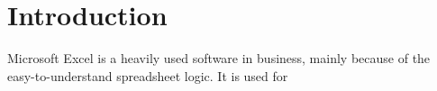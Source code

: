 \chapter{Introduction}
Microsoft Excel is a heavily used software in business, mainly because of the easy-to-understand spreadsheet logic. It is used for 
